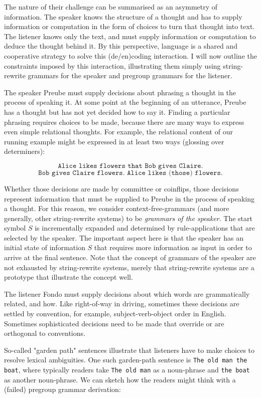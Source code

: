 \begin{fullwidth}
The nature of their challenge can be summarised as an asymmetry of information. The speaker knows the structure of a thought and has to supply information or computation in the form of choices to turn that thought into text. The listener knows only the text, and must supply information or computation to deduce the thought behind it. By this perspective, language is a shared and cooperative strategy to solve this (de/en)coding interaction. I will now outline the constraints imposed by this interaction, illustrating them simply using string-rewrite grammars for the speaker and pregroup grammars for the listener.

 The speaker Preube must supply decisions about phrasing a thought in the process of speaking it. At some point at the beginning of an utterance, Preube has a thought but has not yet decided how to say it. Finding a particular phrasing requires choices to be made, because there are many ways to express even simple relational thoughts. For example, the relational content of our running example might be expressed in at least two ways (glossing over determiners):

\[\texttt{Alice likes flowers that Bob gives Claire.}\]
\[\texttt{Bob gives Claire flowers. Alice likes (those) flowers.}\]

Whether those decisions are made by committee or coinflips, those decisions represent information that must be supplied to Preube in the process of speaking a thought. For this reason, we consider context-free-grammars (and more generally, other string-rewrite systems) to be \emph{grammars of the speaker}. The start symbol $S$ is incrementally expanded and determined by rule-applications that are selected by the speaker. The important aspect here is that the speaker has an initial state of information $S$ that requires more information as input in order to arrive at the final sentence. Note that the concept of grammars of the speaker are not exhausted by string-rewrite systems, merely that string-rewrite systems are a prototype that illustrate the concept well.

 The listener Fondo must supply decisions about which words are grammatically related, and how. Like right-of-way in driving, sometimes these decisions are settled by convention, for example, subject-verb-object order in English. Sometimes sophisticated decisions need to be made that override or are orthogonal to conventions.

\begin{example}
So-called "garden path" sentences illustrate that listeners have to make choices to resolve lexical ambiguities. One such garden-path sentence is \texttt{The old man the boat}, where typically readers take \texttt{The old man} as a noun-phrase and \texttt{the boat} as another noun-phrase. We can sketch how the readers might think with a (failed) pregroup grammar derivation:


\end{example}
\end{fullwidth}
